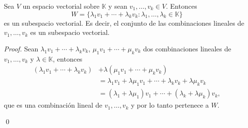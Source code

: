 \documentclass[handout]{beamer} %
\newcommand{\K}{\mathbb K}
\begin{document}
\begin{comment}
            Ahora bien,  como $W$ es subespacio, $\lambda_iw_i \in W$ para $1\le i \le k$. 
            
            \vskip .2cm
            Por un argumento inductivo, como $W$  es subespacio, no es difícil probar que la suma de $k$ términos en $W$ es un elemento de $W$, por lo tanto $\lambda_1w_1+\cdots+\lambda_kw_k \in W$. 
            
            \qed
    \end{demostracion}
            
\end{frame}

\end{comment}                    
    

\begin{frame}

\begin{teorema}
    Sea $V$ un espacio vectorial sobre $\K$ y sean $v_1,\ldots,v_k \in V$. Entonces
    $$
    W = \{\lambda_1v_1+\cdots+\lambda_kv_k: \lambda_1,\ldots,\lambda_k \in \K \}
    $$
    es un subespacio vectorial. Es decir,  el conjunto de las combinaciones lineales de $v_1,\ldots,v_k$ es un subespacio vectorial.
    \end{teorema}  \pause
    \begin{proof}  \pause
                Sean $\lambda_1v_1+\cdots+\lambda_kv_k$, $\mu_1v_1+\cdots+\mu_kv_k$ dos combinaciones lineales de $v_1,\ldots,v_k$ y $\lambda \in \K$, entonces 
            \begin{align*}
                (\lambda_1v_1+\cdots+\lambda_kv_k)&+\lambda (\mu_1v_1+\cdots+\mu_kv_k) \\&=  \lambda_1v_1+\lambda\mu_1v_1+\cdots+\lambda_kv_k+\lambda\mu_kv_k\\
                &= (\lambda_1+\lambda\mu_1)v_1+\cdots+(\lambda_k+\lambda\mu_k)v_k,
            \end{align*}
            que es  una combinación lineal de  $v_1,\ldots,v_k$ y por lo tanto pertenece a $W$. 
            
            \qed
    \end{proof}
    
\end{frame}

        
\end{document}
